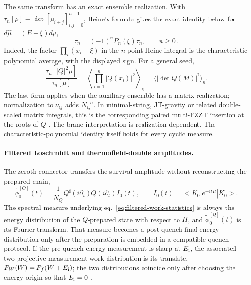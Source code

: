 \documentclass[a4paper,11pt]{article}
\def\ket#1{|#1>}%
\def\bra#1{<#1|}%
\def\dd{d}%
\def\ii{i}%
\def\ee{e}%
\theoremstyle{definition}
\theoremstyle{remark}
\newcommand{\ket}[1]{|#1\rangle}
\newcommand{\bra}[1]{\langle #1|}
\newcommand{\dd}{\mathrm d}
\newcommand{\ii}{\mathrm i}
\newcommand{\ee}{\mathrm e}
\newcommand{\Qsh}{Q^{\sharp}}
\begin{document}
The same transform has an exact ensemble realization.  With
$\tau_n[\mu]=\det[\mu_{i+j}]_{i,j=0}^{n-1}$, Heine's formula gives the exact identity below for $\dd\widehat\mu=(E-\xi)\dd\mu $,
\begin{equation}
   \widehat\tau_n=(-1)^nP_n(\xi)\tau_n,
   \qquad n\ge0\,.
   \label{eq:tau-christoffel}
\end{equation}
Indeed, the factor $\prod_i(x_i-\xi)$ in the $n$-point Heine integral is the characteristic
polynomial average, with the displayed sign.  For a general seed,
\begin{equation}
   \frac{\tau_n[|Q|^2\mu]}{\tau_n[\mu]}
   =\left\langle\prod_{i=1}^{n}|Q(x_i)|^2\right\rangle_n
   =\bigl\langle|\det Q(M)|^2\bigr\rangle_n.
   \label{eq:multi-determinant-seed}
\end{equation}
The last form applies when the auxiliary ensemble has a matrix realization; normalization to
$\nu_Q$ adds $N_Q^{-n}$.  In minimal-string, JT-gravity or related double-scaled matrix integrals,
this is the corresponding paired multi-FZZT insertion at the roots of $Q$
\cite{FyodorovStrahov2003,OkuyamaSakai2021FZZT}.  The brane interpretation is
realization dependent.  The characteristic-polynomial identity itself holds for every cyclic
measure.

\paragraph{Filtered Loschmidt and thermofield-double amplitudes.}
The zeroth connector transfers the survival amplitude without reconstructing the prepared chain,
\begin{equation}
   \widetilde\phi_0^{[Q]}(t)
   =\frac{1}{N_Q}\Qsh(\ii\partial_t)Q(\ii\partial_t)I_0(t),
   \qquad
   I_0(t)=\bra{K_0}\ee^{-\ii tH}\ket{K_0}.
   \label{eq:filtered-work-statistics}
\end{equation}
The
spectral measure underlying eq.~\eqref{eq:filtered-work-statistics} is always the energy distribution
of the $Q$-prepared state with respect to $H$, and $\widetilde\phi_0^{[Q]}(t)$ is its Fourier transform.
That measure becomes a post-quench final-energy distribution only after the preparation is embedded
in a compatible quench protocol.  If the pre-quench energy measurement is sharp at $E_{\rm i}$,
the associated two-projective-measurement work distribution is its translate,
$P_W(W)=P_f(W+E_{\rm i})$; the two distributions coincide only after choosing the energy origin so
that $E_{\rm i}=0$ \cite{TalknerLutzHanggi2007,KrylovDQPT2023}.
\end{document}
